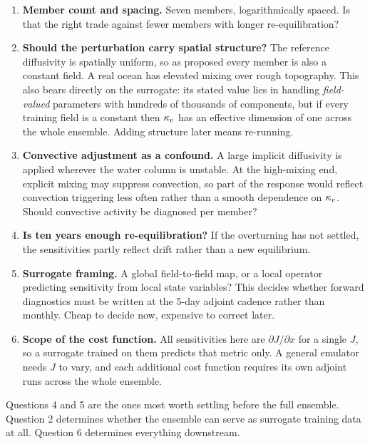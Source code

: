 \begin{enumerate}
  \item \textbf{Member count and spacing.} Seven members, logarithmically
        spaced. Is that the right trade against fewer members with longer
        re-equilibration?

  \item \textbf{Should the perturbation carry spatial structure?} The reference
        diffusivity is spatially uniform, so as proposed every member is also a
        constant field. A real ocean has elevated mixing over rough topography.
        This also bears directly on the surrogate: its stated value lies in
        handling \emph{field-valued} parameters with hundreds of thousands of
        components, but if every training field is a constant then $\kappa_{v}$ has an
        effective dimension of one across the whole ensemble. Adding structure
        later means re-running.

  \item \textbf{Convective adjustment as a confound.} A large implicit
        diffusivity is applied wherever the water column is unstable. At the
        high-mixing end, explicit mixing may suppress convection, so part of the
        response would reflect convection triggering less often rather than a
        smooth dependence on $\kappa_{v}$. Should convective activity be diagnosed per
        member?

  \item \textbf{Is ten years enough re-equilibration?} If the overturning has not
        settled, the sensitivities partly reflect drift rather than a new
        equilibrium.

  \item \textbf{Surrogate framing.} A global field-to-field map, or a local
        operator predicting sensitivity from local state variables? This decides
        whether forward diagnostics must be written at the 5-day adjoint cadence
        rather than monthly. Cheap to decide now, expensive to correct later.

  \item \textbf{Scope of the cost function.} All sensitivities here are
        $\partial J/\partial x$ for a single $J$, so a surrogate trained on them
        predicts that metric only. A general emulator needs $J$ to vary, and each
        additional cost function requires its own adjoint runs across the whole
        ensemble.
\end{enumerate}

Questions 4 and 5 are the ones most worth settling before the full ensemble.
Question 2 determines whether the ensemble can serve as surrogate training data
at all. Question 6 determines everything downstream.

